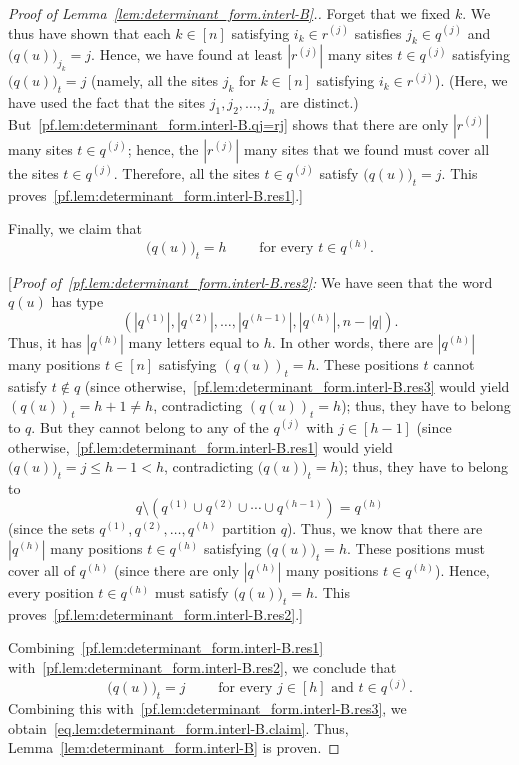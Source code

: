 \documentclass[reqno]{amsart}
\newcommand{\0}{\phantom{c}}
\newcommand{\abs}[1]{\left| #1 \right|}
\newcommand{\tup}[1]{\left( #1 \right)}
\newcommand{\ive}[1]{\left[ #1 \right]}
\theoremstyle{plain}
\theoremstyle{definition}
\numberwithin{equation}{section}
\begin{document}
\begin{proof}[Proof of Lemma~\ref{lem:determinant_form.interl-B}.]
Forget that we fixed $k$.
We thus have shown that each $k \in \ive{n}$ satisfying $i_k \in r^{(j)}$
satisfies $j_k \in q^{(j)}$ and $\bigl( q(u) \bigr)_{j_k} = j$.
Hence, we have found at least $\abs{r^{(j)}}$ many sites $t \in q^{(j)}$
satisfying $\bigl( q(u) \bigr)_t = j$ (namely, all the sites $j_k$ for $k \in \ive{n}$
satisfying $i_k \in r^{(j)}$).
(Here, we have used the fact that the sites $j_1, j_2, \ldots, j_n$ are distinct.)
But~\eqref{pf.lem:determinant_form.interl-B.qj=rj} shows that there are
only $\abs{r^{(j)}}$ many sites $t \in q^{(j)}$;
hence, the $\abs{r^{(j)}}$ many sites that we found must cover all the
sites $t \in q^{(j)}$.
Therefore, all the sites $t \in q^{(j)}$ satisfy $\bigl( q(u) \bigr)_t = j$.
This proves~\eqref{pf.lem:determinant_form.interl-B.res1}.]

Finally, we claim that
\begin{equation}
\label{pf.lem:determinant_form.interl-B.res2}
\bigl( q(u) \bigr)_t = h
\qquad \text{ for every } t \in q^{(h)} .
\end{equation}

[\textit{Proof of~\eqref{pf.lem:determinant_form.interl-B.res2}:}
We have seen that the word $q(u)$ has type
\[
\tup{\abs{q^{(1)}}, \abs{q^{(2)}}, \ldots, \abs{q^{(h-1)}}, \abs{q^{(h)}} ,
n - \abs{q}} .
\]
Thus, it has $\abs{q^{(h)}}$ many letters equal to $h$.
In other words, there are $\abs{q^{(h)}}$ many positions $t \in \ive{n}$
satisfying $(q(u))_t = h$.
These positions $t$ cannot satisfy $t \notin q$ (since
otherwise,~\eqref{pf.lem:determinant_form.interl-B.res3}
would yield $(q(u))_t = h+1 \neq h$, contradicting $(q(u))_t = h$);
thus, they have to belong to $q$.
But they cannot belong to any of the $q^{(j)}$ with $j \in \ive{h-1}$
(since otherwise,~\eqref{pf.lem:determinant_form.interl-B.res1}
would yield $\bigl( q(u) \bigr)_t = j \leq h-1 < h$, contradicting $\bigl( q(u) \bigr)_t = h$);
thus, they have to belong to
\[
q \setminus \tup{q^{(1)} \cup q^{(2)} \cup \cdots \cup q^{(h-1)}} = q^{(h)}
\]
(since the sets $q^{(1)}, q^{(2)}, \ldots, q^{(h)}$ partition $q$).
Thus, we know that there are $\abs{q^{(h)}}$ many positions $t \in q^{(h)}$ satisfying $\bigl( q(u) \bigr)_t = h$.
These positions must cover all of $q^{(h)}$ (since there are only $\abs{q^{(h)}}$ many positions $t \in q^{(h)}$).
Hence, every position $t \in q^{(h)}$ must satisfy $\bigl( q(u) \bigr)_t = h$.
This proves~\eqref{pf.lem:determinant_form.interl-B.res2}.]

Combining~\eqref{pf.lem:determinant_form.interl-B.res1}
with~\eqref{pf.lem:determinant_form.interl-B.res2}, we conclude that
\[
\bigl( q(u) \bigr)_t = j
\qquad \text{ for every } j \in \ive{h} \text{ and } t \in q^{(j)} .
\]
Combining this with~\eqref{pf.lem:determinant_form.interl-B.res3},
we obtain~\eqref{eq.lem:determinant_form.interl-B.claim}.
Thus, Lemma~\ref{lem:determinant_form.interl-B} is proven.
\end{proof}
\end{document}
